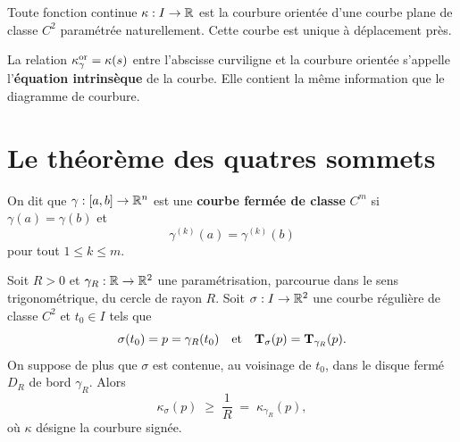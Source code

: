 \begin{theoreme}
	Toute fonction continue $\kappa : I \to \mathbb{R}$ est la courbure orientée d'une courbe plane de classe $C^2$ paramétrée naturellement. Cette courbe est unique à déplacement près.
\end{theoreme}


\begin{remarque}
	La relation $\kappa_\gamma^{\operatorname{or}} = \kappa(s)$ entre l'abscisse curviligne et la courbure orientée s'appelle l'\textbf{équation intrinsèque} de la courbe. Elle contient la même information que le diagramme de courbure.
\end{remarque}

\section{Le théorème des quatres sommets}

\begin{definition}
	On dit que $\gamma : [a,b] \to \mathbb{R}^n$ est une \textbf{courbe fermée de classe} $C^m$ si $\gamma(a) = \gamma(b)$ et
	\[
	\gamma^{(k)} (a) =  \gamma^{(k)}(b)
	\]
	pour tout $ 1 \leqslant k \leqslant m$.
\end{definition}

\begin{lemme}
	Soit $R>0$ et $\gamma_R : \mathbb{R} \to \mathbb{R}^2$ une paramétrisation, parcourue dans le
	sens trigonométrique, du cercle de rayon $R$. Soit $\sigma : I \to \mathbb{R}^2$ une
	courbe régulière de classe $C^2$ et $t_0 \in I$ tels que
	\[
	\sigma(t_0) = p = \gamma_R(t_0) \quad \text{et} \quad \mathbf{T}_\sigma(p) = \mathbf{T}_{\gamma_R}(p).
	\]
	On suppose de plus que $\sigma$ est contenue, au voisinage de $t_0$, dans le
	disque fermé $D_R$ de bord $\gamma_R$. Alors
	\[
	\kappa_\sigma(p) \;\geqslant\; \frac{1}{R} \;=\; \kappa_{\gamma_R}(p),
	\]
	où $\kappa$ désigne la courbure signée.
\end{lemme}


